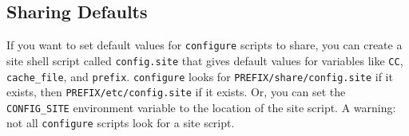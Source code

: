 \begin{appendix}
\subsection*{Sharing Defaults}
   If you want to set default values for \verb+configure+ scripts to share,
you can create a site shell script called \verb+config.site+ that gives
default values for variables like \verb+CC+,  \verb+cache_file+, and 
\verb+prefix+.
\verb+configure+ looks for \verb+PREFIX/share/config.site+ if it exists, then
\verb+PREFIX/etc/config.site+ if it exists.  Or, you can set the
\verb+CONFIG_SITE+ environment variable to the location of the site script.
A warning: not all \verb+configure+ scripts look for a site script.



{\footnotesize



}


\end{appendix}


